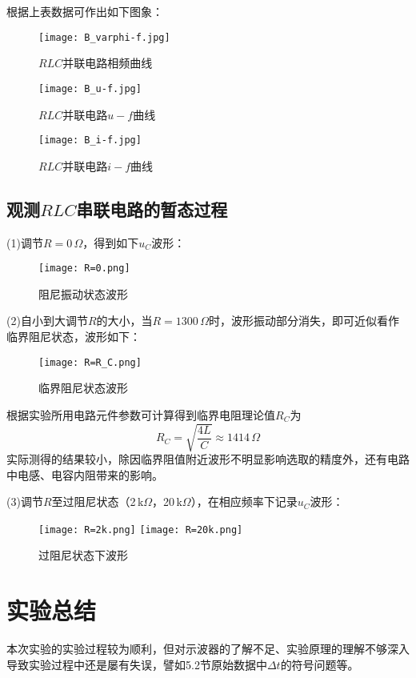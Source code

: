 \documentclass[UTF-8,twoside,cs4size]{ctexart}
\begin{document}
	根据上表数据可作出如下图象：
	\begin{figure}[!h]
		\centering
		\texttt{[image: B\_varphi-f.jpg]}
		\caption{$ RLC $并联电路相频曲线}
	\end{figure}

	\newpage
	\begin{figure}[!h]
		\centering
		\texttt{[image: B\_u-f.jpg]}
		\caption{$ RLC $并联电路$ u-f $曲线}
		\texttt{[image: B\_i-f.jpg]}
		\caption{$ RLC $并联电路$ i-f $曲线}
	\end{figure}
	\subsection{观测$ RLC $串联电路的暂态过程}
	(1)调节$ R=0\,\Omega $，得到如下$ u_C $波形：
	\begin{figure}[!h]
		\centering
		\texttt{[image: R=0.png]}
		\caption{阻尼振动状态波形}
	\end{figure}
	
	
	(2)自小到大调节$ R $的大小，当$ R=1300\,\Omega $时，波形振动部分消失，即可近似看作临界阻尼状态，波形如下：
	\begin{figure}[!h]
		\centering
		\texttt{[image: R=R\_C.png]}
		\caption{临界阻尼状态波形}
	\end{figure}
	
	根据实验所用电路元件参数可计算得到临界电阻理论值$ R_C $为
	\[R_C=\sqrt{\frac{4L}{C}}\approx1414\,\Omega\]
	实际测得的结果较小，除因临界阻值附近波形不明显影响选取的精度外，还有电路中电感、电容内阻带来的影响。
	
	(3)调节$ R $至过阻尼状态（2\,k$\Omega$，20\,k$\Omega$），在相应频率下记录$ u_C $波形：
	\begin{figure}[!h]
		\centering
		\texttt{[image: R=2k.png]}
		\texttt{[image: R=20k.png]}
		\caption{过阻尼状态下波形}
	\end{figure}
	\section{实验总结}
	本次实验的实验过程较为顺利，但对示波器的了解不足、实验原理的理解不够深入导致实验过程中还是屡有失误，譬如5.2节原始数据中$ \Delta t $的符号问题等。
\end{document}
